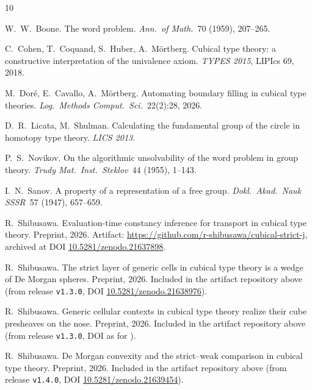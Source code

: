 \documentclass[11pt]{amsart}
\theoremstyle{definition}
\begin{document}
\begin{thebibliography}{10}

W.~W.~Boone.
\newblock The word problem.
\newblock \emph{Ann.\ of Math.}\ 70 (1959), 207--265.

C.~Cohen, T.~Coquand, S.~Huber, A.~M\"ortberg.
\newblock Cubical type theory: a constructive interpretation of the
  univalence axiom.
\newblock \emph{TYPES 2015}, LIPIcs 69, 2018.

M.~Dor\'e, E.~Cavallo, A.~M\"ortberg.
\newblock Automating boundary filling in cubical type theories.
\newblock \emph{Log.\ Methods Comput.\ Sci.}\ 22(2):28, 2026.

D.~R.~Licata, M.~Shulman.
\newblock Calculating the fundamental group of the circle in
  homotopy type theory.
\newblock \emph{LICS 2013}.

P.~S.~Novikov.
\newblock On the algorithmic unsolvability of the word problem in
  group theory.
\newblock \emph{Trudy Mat.\ Inst.\ Steklov}\ 44 (1955), 1--143.

I.~N.~Sanov.
\newblock A property of a representation of a free group.
\newblock \emph{Dokl.\ Akad.\ Nauk SSSR}\ 57 (1947), 657--659.

R.~Shibusawa.
\newblock Evaluation-time constancy inference for transport in
  cubical type theory.
\newblock Preprint, 2026.  Artifact:
  \url{https://github.com/r-shibusawa/cubical-strict-j}, archived
  at DOI \href{https://doi.org/10.5281/zenodo.21637898}%
  {10.5281/zenodo.21637898}.

R.~Shibusawa.
\newblock The strict layer of generic cells in cubical type theory
  is a wedge of De Morgan spheres.
\newblock Preprint, 2026.  Included in the artifact repository
  above (from release \texttt{v1.3.0}, DOI
  \href{https://doi.org/10.5281/zenodo.21638976}%
  {10.5281/zenodo.21638976}).

R.~Shibusawa.
\newblock Generic cellular contexts in cubical type theory realize
  their cube presheaves on the nose.
\newblock Preprint, 2026.  Included in the artifact repository
  above (from release \texttt{v1.3.0}, DOI as for \cite{Sphere}).

R.~Shibusawa.
\newblock De Morgan convexity and the strict--weak comparison in
  cubical type theory.
\newblock Preprint, 2026.  Included in the artifact repository
  above (from release \texttt{v1.4.0}, DOI
  \href{https://doi.org/10.5281/zenodo.21639454}%
  {10.5281/zenodo.21639454}).

\end{thebibliography}
\end{document}
